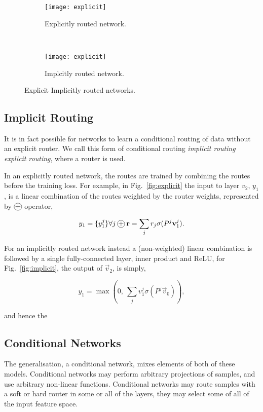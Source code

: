 \documentclass[thesis]{subfiles}
\begin{document}
\begin{figure}[htbp!] 
\centering
\begin{subfigure}[b]{0.45\textwidth}
   \centering
   \texttt{[image: explicit]}
   \caption{Explicitly routed network.}
   \label{fig:explicitRouter}
\end{subfigure}
~
\begin{subfigure}[b]{0.45\textwidth}
   \centering
   \texttt{[image: explicit]}
   \caption{Implcitly routed network.}
   \label{fig:implicitRouter}
\end{subfigure}
\caption{Explicit \vs Implicitly routed networks.}
\label{fig:routerConnections}
\end{figure}

\subsection{Implicit Routing}
It is in fact possible for networks to learn a conditional routing of data without an explicit router. We call this form of conditional routing \emph{implicit routing} \vs \emph{explicit routing}, where a router is used. 

In an explicitly routed network, the routes are trained by combining the routes before the training loss. For example, in Fig.~\ref{fig:explicit} the input to layer $v_2$, $y_1$, is a linear combination of the routes weighted by the router weights, represented by $\circleplus$ operator,

\begin{equation}
	y_1 = \{y_1^j\} \forall j\circleplus \vec r = \sum_j r_j \sigma(P^j \vec v_1^j ).
\end{equation}

For an implicitly routed network instead a (non-weighted) linear combination is followed by a single fully-connected layer, \ie inner product and ReLU, \ie for Fig.~\ref{fig:implicit}, the output of $\vec v_2$,  is simply,

\begin{equation}
	y_1 = \max (0, ~\sum_j v_1^j \sigma(P^j \vec v_0) ), 
\end{equation}

and hence the 

\subsection{Conditional Networks}
The generalisation, a conditional network, mixes elements of both of these models. Conditional networks may perform arbitrary projections of samples, and use arbitrary non-linear functions. Conditional networks may route samples with a soft or hard router in some or all of the layers, they may select some of all of the input feature space. 
\end{document}

